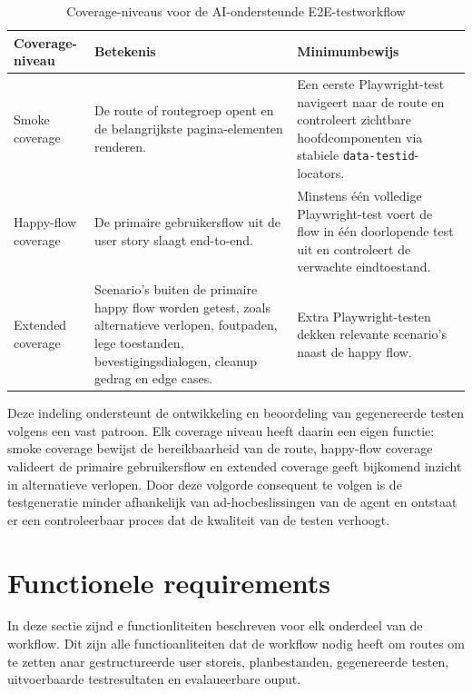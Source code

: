 \begin{table}[H]
    \centering
    \begin{tabular}{|p{}|p{}|p{}|}
        \hline
        \textbf{Coverage-niveau} & \textbf{Betekenis} & \textbf{Minimumbewijs} \\
        \hline
        Smoke coverage & De route of routegroep opent en de belangrijkste pagina-elementen renderen. & Een eerste Playwright-test navigeert naar de route en controleert zichtbare hoofdcomponenten via stabiele \texttt{data-testid}-locators. \\
        \hline
        Happy-flow coverage & De primaire gebruikersflow uit de user story slaagt end-to-end. & Minstens één volledige Playwright-test voert de flow in één doorlopende test uit en controleert de verwachte eindtoestand. \\
        \hline
        Extended coverage & Scenario's buiten de primaire happy flow worden getest, zoals alternatieve verlopen, foutpaden, lege toestanden, bevestigingsdialogen, cleanup gedrag en edge cases. & Extra Playwright-testen dekken relevante scenario's naast de happy flow. \\
        \hline
    \end{tabular}
    \caption{Coverage-niveaus voor de AI-ondersteunde E2E-testworkflow}
    \label{tab:coverage-niveaus}
\end{table}

Deze indeling ondersteunt de ontwikkeling en beoordeling van gegenereerde testen volgens een vast patroon. Elk coverage niveau heeft daarin een eigen functie: smoke coverage bewijst de bereikbaarheid van de route, happy-flow coverage valideert de primaire gebruikersflow en extended coverage geeft bijkomend inzicht in alternatieve verlopen. Door deze volgorde consequent te volgen is de testgeneratie minder afhankelijk van ad-hocbeslissingen van de agent en ontstaat er een controleerbaar proces dat de kwaliteit van de testen verhoogt.


\section{Functionele requirements}

In deze sectie zijnd e functionliteiten beschreven voor elk onderdeel van de workflow. Dit zijn alle functioanliteiten dat de workflow nodig heeft om routes om te zetten anar gestructureerde user storeis, planbestanden, gegenereerde testen, uitvoerbaarde testresultaten en evalaueerbare ouput.

